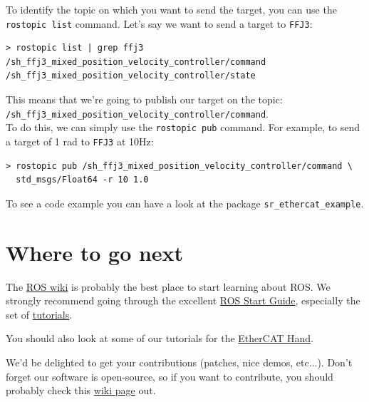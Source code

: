 \documentclass[12pt]{article}
\begin{document}
\par To identify the topic on which you want to send the target, you can use the \texttt{rostopic list} command. Let's say we want to send a target to \texttt{FFJ3}:
  \begin{lstlisting}[escapeinside='']
> rostopic list | grep ffj3
/sh_ffj3_mixed_position_velocity_controller/command
/sh_ffj3_mixed_position_velocity_controller/state
  \end{lstlisting}

\par This means that we're going to publish our target on the topic:\\
\hspace*{40pt} \texttt{/sh\_ffj3\_mixed\_position\_velocity\_controller/command}.\\
To do this, we can simply use the \texttt{rostopic pub} command. For example, to send a target of 1 rad to \texttt{FFJ3} at 10Hz:
  \begin{lstlisting}[escapeinside='']
> rostopic pub /sh_ffj3_mixed_position_velocity_controller/command \
  std_msgs/Float64 -r 10 1.0
  \end{lstlisting}

\par To see a code example you can have a look at the package \texttt{sr\_ethercat\_example}.

\newpage

\section{Where to go next}
\label{sec:where-to-go}
\par The \href{http://ros.org/wiki}{ROS wiki} is probably the best place to start learning about ROS. We strongly recommend going through the excellent \href{http://ros.org/wiki/ROS/StartGuide}{ROS Start Guide}, especially the set of \href{http://ros.org/wiki/ROS/Tutorials}{tutorials}.\\

\par You should also look at some of our tutorials for the \href{http://ros.org/wiki/shadow_robot_etherCAT/Tutorials}{EtherCAT Hand}.\\

\par We'd be delighted to get your contributions (patches, nice demos, etc...). Don't forget our software is open-source, so if you want to contribute, you should probably check this \href{http://ros.org/wiki/shadow_robot#Contributing}{wiki page} out.
\newpage
\end{document}
